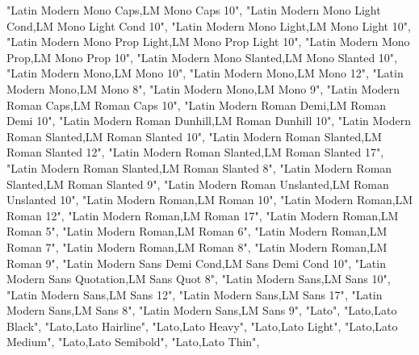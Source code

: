 \documentclass[
]{article}
\newenvironment{Shaded}{\begin{snugshade}}{\end{snugshade}}
\newcommand{\NormalTok}[1]{#1}
\newcommand{\StringTok}[1]{\textcolor[rgb]{0.31,0.60,0.02}{#1}}
\begin{document}
\begin{Shaded}
\begin{Highlighting}[]
  \StringTok{"Latin Modern Mono Caps,LM Mono Caps 10"}\NormalTok{,}
  \StringTok{"Latin Modern Mono Light Cond,LM Mono Light Cond 10"}\NormalTok{,}
  \StringTok{"Latin Modern Mono Light,LM Mono Light 10"}\NormalTok{,}
  \StringTok{"Latin Modern Mono Prop Light,LM Mono Prop Light 10"}\NormalTok{,}
  \StringTok{"Latin Modern Mono Prop,LM Mono Prop 10"}\NormalTok{,}
  \StringTok{"Latin Modern Mono Slanted,LM Mono Slanted 10"}\NormalTok{,}
  \StringTok{"Latin Modern Mono,LM Mono 10"}\NormalTok{,}
  \StringTok{"Latin Modern Mono,LM Mono 12"}\NormalTok{,}
  \StringTok{"Latin Modern Mono,LM Mono 8"}\NormalTok{,}
  \StringTok{"Latin Modern Mono,LM Mono 9"}\NormalTok{,}
  \StringTok{"Latin Modern Roman Caps,LM Roman Caps 10"}\NormalTok{,}
  \StringTok{"Latin Modern Roman Demi,LM Roman Demi 10"}\NormalTok{,}
  \StringTok{"Latin Modern Roman Dunhill,LM Roman Dunhill 10"}\NormalTok{,}
  \StringTok{"Latin Modern Roman Slanted,LM Roman Slanted 10"}\NormalTok{,}
  \StringTok{"Latin Modern Roman Slanted,LM Roman Slanted 12"}\NormalTok{,}
  \StringTok{"Latin Modern Roman Slanted,LM Roman Slanted 17"}\NormalTok{,}
  \StringTok{"Latin Modern Roman Slanted,LM Roman Slanted 8"}\NormalTok{,}
  \StringTok{"Latin Modern Roman Slanted,LM Roman Slanted 9"}\NormalTok{,}
  \StringTok{"Latin Modern Roman Unslanted,LM Roman Unslanted 10"}\NormalTok{,}
  \StringTok{"Latin Modern Roman,LM Roman 10"}\NormalTok{,}
  \StringTok{"Latin Modern Roman,LM Roman 12"}\NormalTok{,}
  \StringTok{"Latin Modern Roman,LM Roman 17"}\NormalTok{,}
  \StringTok{"Latin Modern Roman,LM Roman 5"}\NormalTok{,}
  \StringTok{"Latin Modern Roman,LM Roman 6"}\NormalTok{,}
  \StringTok{"Latin Modern Roman,LM Roman 7"}\NormalTok{,}
  \StringTok{"Latin Modern Roman,LM Roman 8"}\NormalTok{,}
  \StringTok{"Latin Modern Roman,LM Roman 9"}\NormalTok{,}
  \StringTok{"Latin Modern Sans Demi Cond,LM Sans Demi Cond 10"}\NormalTok{,}
  \StringTok{"Latin Modern Sans Quotation,LM Sans Quot 8"}\NormalTok{,}
  \StringTok{"Latin Modern Sans,LM Sans 10"}\NormalTok{,}
  \StringTok{"Latin Modern Sans,LM Sans 12"}\NormalTok{,}
  \StringTok{"Latin Modern Sans,LM Sans 17"}\NormalTok{,}
  \StringTok{"Latin Modern Sans,LM Sans 8"}\NormalTok{,}
  \StringTok{"Latin Modern Sans,LM Sans 9"}\NormalTok{,}
  \StringTok{"Lato"}\NormalTok{,}
  \StringTok{"Lato,Lato Black"}\NormalTok{,}
  \StringTok{"Lato,Lato Hairline"}\NormalTok{,}
  \StringTok{"Lato,Lato Heavy"}\NormalTok{,}
  \StringTok{"Lato,Lato Light"}\NormalTok{,}
  \StringTok{"Lato,Lato Medium"}\NormalTok{,}
  \StringTok{"Lato,Lato Semibold"}\NormalTok{,}
  \StringTok{"Lato,Lato Thin"}\NormalTok{,}

\end{Highlighting}
\end{Shaded}
\end{document}
